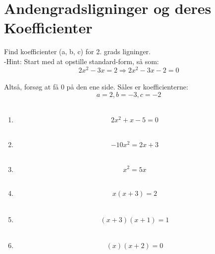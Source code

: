 \documentclass[12pt]{article}
\begin{document}
\section*{Andengradsligninger og deres Koefficienter}

Find koefficienter (a, b, c) for 2. grads ligninger. \\
 -Hint: Start med at opstille standard-form, så som:
 \[2x^2 -3x = 2 \Rightarrow 2x^2-3x-2 = 0\] \\
 Altså, forsøg at få 0 på den ene side. Såles er koefficienterne:\\
 \[a = 2, b=-3, c=-2\]
\\
\begin{enumerate}
     \item \[2x^2 + x - 5 = 0\]\\
     \item \[-10x^2=2x+3\] \\
     \item \[x^2 = 5x\] \\
     \item \[x(x+3)=2\]\\
     \item \[(x+3)(x+1) = 1\] \\
     \item \[(x)(x+2) = 0\]
\end{enumerate}
\end{document}
